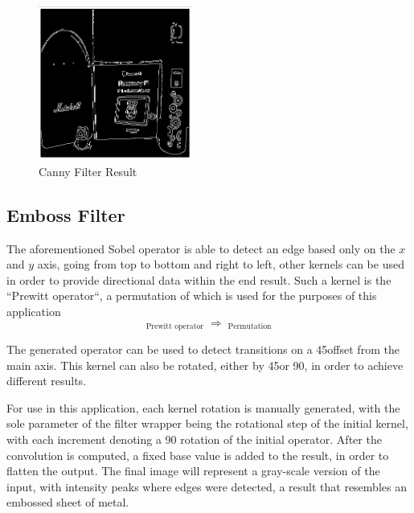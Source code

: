 \begin{figure}[H]
	\includegraphics[width=0.45\textwidth, height=0.45\textwidth]{resources/Canny_2.png}
	\caption{Canny Filter Result}
\end{figure}

\subsection{Emboss Filter}

The aforementioned Sobel operator is able to detect an edge based only on the \(x\) and \(y\) axis, going from
top to bottom and right to left, other kernels can be used in order to provide directional data within the end
result. Such a kernel is the ``Prewitt operator``, a permutation of which is used for the purposes of this
application \cite{dipBook}
\begin{equation}
	\mathop{
		\begin{bmatrix}
			-1 & 0 & 1 \\
			-1 & 0 & 1 \\
			-1 & 0 & 1 \\
		\end{bmatrix}
	}_{\textstyle \text{Prewitt operator}}
	\Rightarrow
	\mathop{
		\begin{bmatrix}
			-1 & -1 & 0 \\
			-1 & 0  & 1 \\
			0  & 1  & 1 \\
		\end{bmatrix}
	}_{\textstyle \text{Permutation}}
\end{equation}

The generated operator can be used to detect transitions on a 45\textdegree offset from the main axis. This
kernel can also be rotated, either by 45\textdegree or 90\textdegree, in order to achieve different results.

For use in this application, each kernel rotation is manually generated, with the sole parameter of the
filter wrapper being the rotational step of the initial kernel, with each increment denoting a 90\textdegree
rotation of the initial operator. After the convolution is computed, a fixed base value is added to the
result, in order to flatten the output. The final image will represent a gray-scale version of the input,
with intensity peaks where edges were detected, a result that resembles an embossed sheet of metal.

